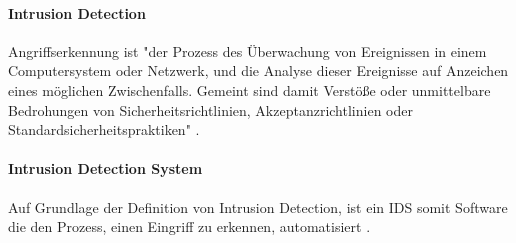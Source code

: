 \paragraph{Intrusion Detection}
Angriffserkennung ist "der Prozess des Überwachung von Ereignissen in einem Computersystem oder Netzwerk, und die Analyse dieser Ereignisse auf Anzeichen eines möglichen Zwischenfalls. Gemeint sind damit Verstöße oder unmittelbare Bedrohungen von Sicherheitsrichtlinien, Akzeptanzrichtlinien oder Standardsicherheitspraktiken" \cite{scarfone2007guide}. 

\paragraph{Intrusion Detection System}
Auf Grundlage der Definition von Intrusion Detection, ist ein IDS somit Software die den Prozess, einen Eingriff zu erkennen, automatisiert \cite{scarfone2007guide}. 





